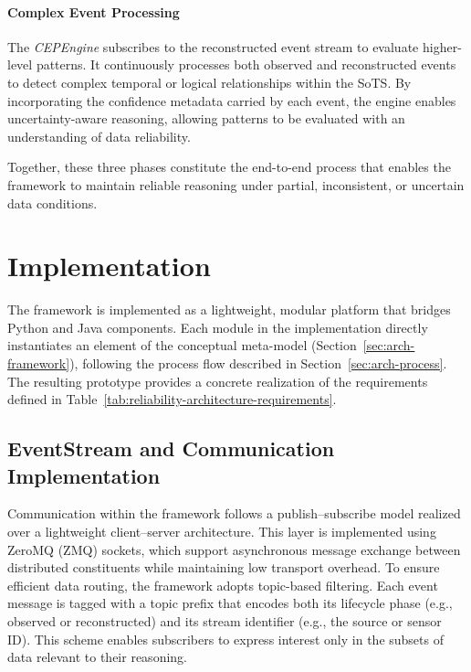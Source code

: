 \paragraph{Complex Event Processing}
The \textit{CEPEngine} subscribes to the reconstructed event stream to evaluate higher-level patterns.
It continuously processes both observed and reconstructed events to detect complex temporal or logical relationships within the SoTS.
By incorporating the confidence metadata carried by each event, the engine enables uncertainty-aware reasoning, allowing patterns to be evaluated with an understanding of data reliability.

Together, these three phases constitute the end-to-end process that enables the framework to maintain reliable reasoning under partial, inconsistent, or uncertain data conditions.


\section{Implementation}\label{sec:architecture-implementation}

The framework is implemented as a lightweight, modular platform that bridges Python and Java components.
Each module in the implementation directly instantiates an element of the conceptual meta-model (Section~\ref{sec:arch-framework}), following the process flow described in Section~\ref{sec:arch-process}.
The resulting prototype provides a concrete realization of the requirements defined in Table~\ref{tab:reliability-architecture-requirements}.


\subsection{EventStream and Communication Implementation}
Communication within the framework follows a publish–subscribe model realized over a lightweight client–server architecture.
This layer is implemented using ZeroMQ (ZMQ) sockets, which support asynchronous message exchange between distributed constituents while maintaining low transport overhead.
To ensure efficient data routing, the framework adopts topic-based filtering.
Each event message is tagged with a topic prefix that encodes both its lifecycle phase (e.g., observed or reconstructed) and its stream identifier (e.g., the source or sensor ID).
This scheme enables subscribers to express interest only in the subsets of data relevant to their reasoning.

